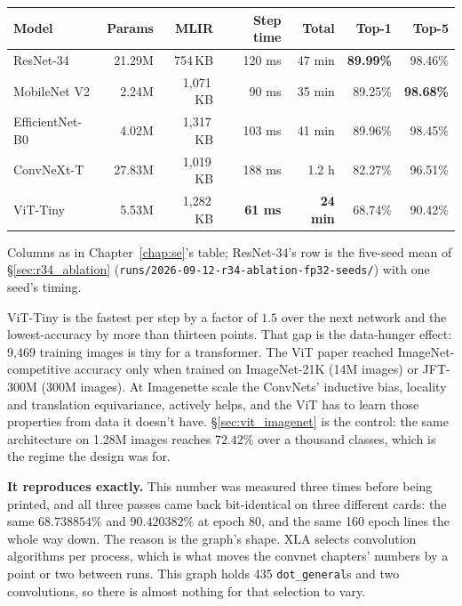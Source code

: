 \begin{center}
\begin{tabular}{l r r r r r r}
\hline
Model            & Params  & MLIR       & Step time & Total    & Top-1 & Top-5 \\
\hline
ResNet-34        & 21.29M  & 754\,KB    & 120 ms    & 47 min   & \textbf{89.99\%} & 98.46\% \\
MobileNet V2     &  2.24M  & 1{,}071\,KB &  90 ms   & 35 min   & 89.25\% & \textbf{98.68\%} \\
EfficientNet-B0  &  4.02M  & 1{,}317\,KB & 103 ms   & 41 min   & 89.96\% & 98.45\% \\
ConvNeXt-T       & 27.83M  & 1{,}019\,KB & 188 ms   & 1.2 h    & 82.27\% & 96.51\% \\
ViT-Tiny         &  5.53M  & 1{,}282\,KB & \textbf{61 ms} & \textbf{24 min} & 68.74\% & 90.42\% \\
\hline
\end{tabular}
\end{center}

\noindent Columns as in Chapter~\ref{chap:se}'s table; ResNet-34's row is the five-seed mean of \S\ref{sec:r34_ablation}
(\texttt{runs/2026-09-12-r34-ablation-fp32-seeds/}) with one seed's timing.

ViT-Tiny is the fastest per step by a factor of $1.5$ over the next
network and the lowest-accuracy by more than thirteen points. That gap
is the data-hunger effect: 9,469 training images is tiny for a
transformer. The ViT paper reached ImageNet-competitive accuracy only
when trained on ImageNet-21K (14M images) or JFT-300M (300M images). At
Imagenette scale the ConvNets' inductive bias, locality and translation
equivariance, actively helps, and the ViT has to learn those properties
from data it doesn't have. \S\ref{sec:vit_imagenet} is the control:
the same architecture on 1.28M images reaches $72.42\%$ over a
thousand classes, which is the regime the design was for.

\medskip\noindent\textbf{It reproduces exactly.} This number was measured three times
before being printed, and all three passes came back bit-identical on three different
cards: the same $68.738854\%$ and $90.420382\%$ at epoch 80, and the same
160 epoch lines the whole way down. The reason is the graph's shape. XLA
selects convolution algorithms per process, which
is what moves the convnet chapters' numbers by a point or two between
runs. This graph holds 435 \texttt{dot\_general}s and two
convolutions, so there is almost nothing for that selection to vary.

